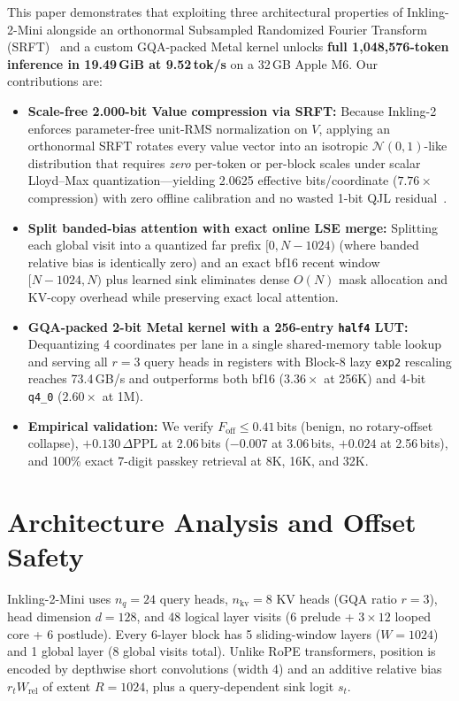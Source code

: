 \documentclass[conference]{IEEEtran}
\newcommand{\dPPL}{\Delta\mathrm{PPL}}
\newcommand{\Foff}{F_{\mathrm{off}}}
\begin{document}
This paper demonstrates that exploiting three architectural properties of Inkling-2-Mini alongside an orthonormal Subsampled Randomized Fourier Transform (SRFT)~\cite{bergach2026whenquantfree} and a custom GQA-packed Metal kernel unlocks \textbf{full 1{,}048{,}576-token inference in 19.49\,GiB at 9.52\,tok/s} on a 32\,GB Apple M6. Our contributions are:
\begin{itemize}
    \item \textbf{Scale-free 2.000-bit Value compression via SRFT:} Because Inkling-2 enforces parameter-free unit-RMS normalization on $V$, applying an orthonormal SRFT rotates every value vector into an isotropic $\mathcal{N}(0,1)$-like distribution that requires \emph{zero} per-token or per-block scales under scalar Lloyd--Max quantization—yielding 2.0625 effective bits/coordinate ($7.76\times$ compression) with zero offline calibration and no wasted 1-bit QJL residual~\cite{zandieh2026turboquant}.
    \item \textbf{Split banded-bias attention with exact online LSE merge:} Splitting each global visit into a quantized far prefix $[0, N-1024)$ (where banded relative bias is identically zero) and an exact bf16 recent window $[N-1024, N)$ plus learned sink eliminates dense $O(N)$ mask allocation and KV-copy overhead while preserving exact local attention.
    \item \textbf{GQA-packed 2-bit Metal kernel with a 256-entry \texttt{half4} LUT:} Dequantizing 4 coordinates per lane in a single shared-memory table lookup and serving all $r=3$ query heads in registers with Block-8 lazy \texttt{exp2} rescaling reaches 73.4\,GB/s and outperforms both bf16 ($3.36\times$ at 256K) and 4-bit \texttt{q4\_0} ($2.60\times$ at 1M).
    \item \textbf{Empirical validation:} We verify $\Foff \le 0.41$\,bits (benign, no rotary-offset collapse), $+0.130\,\dPPL$ at 2.06\,bits ($-0.007$ at 3.06\,bits, $+0.024$ at 2.56\,bits), and 100\% exact 7-digit passkey retrieval at 8K, 16K, and 32K.
\end{itemize}

\section{Architecture Analysis and Offset Safety}
\label{sec:arch}

Inkling-2-Mini uses $n_q=24$ query heads, $n_{\mathrm{kv}}=8$ KV heads (GQA ratio $r=3$), head dimension $d=128$, and 48 logical layer visits (6 prelude + $3\times 12$ looped core + 6 postlude). Every 6-layer block has 5 sliding-window layers ($W=1024$) and 1 global layer (8 global visits total). Unlike RoPE transformers, position is encoded by depthwise short convolutions (width 4) and an additive relative bias $r_t W_{\mathrm{rel}}$ of extent $R=1024$, plus a query-dependent sink logit $s_t$.
\end{document}
